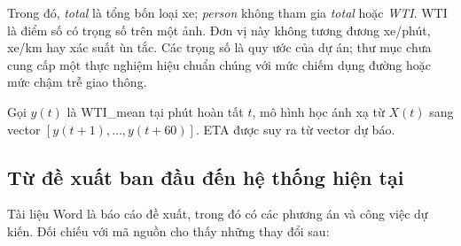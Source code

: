    Trong đó, \textit{total} là tổng bốn loại xe; \textit{person} không tham gia \textit{total} hoặc \textit{WTI}. WTI là điểm số có trọng số trên một ảnh. Đơn vị này không tương đương xe/phút, xe/km hay xác suất ùn tắc. Các trọng số là quy ước của dự án; thư mục chưa cung cấp một thực nghiệm hiệu chuẩn chúng với mức chiếm dụng đường hoặc mức chậm trễ giao thông.

    Gọi $y(t)$ là WTI\_mean tại phút hoàn tất $t$, mô hình học ánh xạ từ $X(t)$ sang vector $[y(t+1), \dots, y(t+60)]$. ETA được suy ra từ vector dự báo.

    \subsection{Từ đề xuất ban đầu đến hệ thống hiện tại}
    Tài liệu Word là báo cáo đề xuất, trong đó có các phương án và công việc dự kiến. Đối chiếu với mã nguồn cho thấy những thay đổi sau:

    
